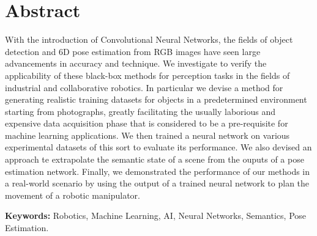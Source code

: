 \chapter*{Abstract} 
With the introduction of Convolutional Neural Networks, the fields of object detection and 6D pose estimation from RGB images have seen large advancements in accuracy and technique. We investigate to verify the applicability of these black-box methods for perception tasks in the fields of industrial and collaborative robotics. In particular we devise a method for generating realistic training datasets for objects in a predetermined environment starting from photographs, greatly facilitating the usually laborious and expensive data acquisition phase that is considered to be a pre-requisite for machine learning applications. We then trained a neural network on various experimental datasets of this sort to evaluate its performance. We also devised an approach te extrapolate the semantic state of a scene from the ouputs of a pose estimation network. Finally, we demonstrated the performance of our methods in a real-world scenario by using the output of a trained neural network to plan the movement of a robotic manipulator. 

\textbf{Keywords:} Robotics, Machine Learning, AI, Neural Networks, Semantics, Pose Estimation.
